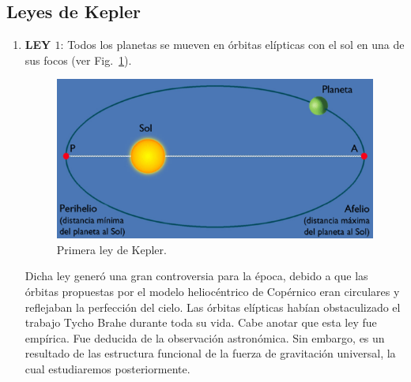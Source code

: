 \subsection{Leyes de Kepler}

\begin{enumerate}
\item \textbf{LEY $1$}: Todos los planetas se mueven en órbitas elípticas con el sol en una de sus focos (ver Fig.~\ref{fig:ley1}).
\begin{figure}[h]
\begin{center}
\includegraphics[scale=0.4]{gravitacion/g-ley1}
\end{center}
\caption{Primera ley de Kepler.}
\label{fig:ley1}
\end{figure}

Dicha ley generó una gran controversia para la época, debido a que las órbitas propuestas por el modelo heliocéntrico de Copérnico eran circulares y reflejaban la perfección del cielo. Las órbitas elípticas habían obstaculizado el trabajo Tycho Brahe durante toda su vida.
Cabe anotar que esta ley fue empírica. Fue deducida de la observación astronómica. Sin embargo, es un resultado de las estructura funcional de la fuerza de gravitación universal, la cual estudiaremos posteriormente.


\end{enumerate}
